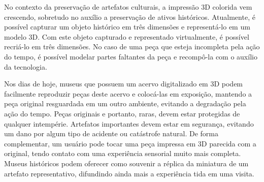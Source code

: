 No contexto da preservação de artefatos culturais, a impressão 3D colorida vem crescendo, sobretudo no auxílio a preservação de ativos históricos. Atualmente, é possível capturar um objeto histórico em três dimensões e representá-lo em um modelo 3D. Com este objeto capturado e representado virtualmente, é possível recriá-lo em três dimensões. No caso de uma peça que esteja incompleta pela ação do tempo, é possível modelar partes faltantes da peça e recompô-la com o auxílio da tecnologia.

Nos dias de hoje, museus que possuem um acervo digitalizado em 3D podem facilmente reproduzir peças deste acervo e colocá-las em exposição, mantendo a peça original resguardada em um outro ambiente, evitando a degradação pela ação do tempo. Peças originais e portanto, raras, devem estar protegidas de qualquer intempérie. Artefatos importantes devem estar em segurança, evitando um dano por algum tipo de acidente ou catástrofe natural. De forma complementar, um usuário pode tocar uma peça impressa em 3D parecida com a original, tendo contato com uma experiência sensorial muito mais completa. Museus históricos podem oferecer como souvenir a réplica da miniatura de um artefato representativo, difundindo ainda mais a experiência tida em uma visita.
